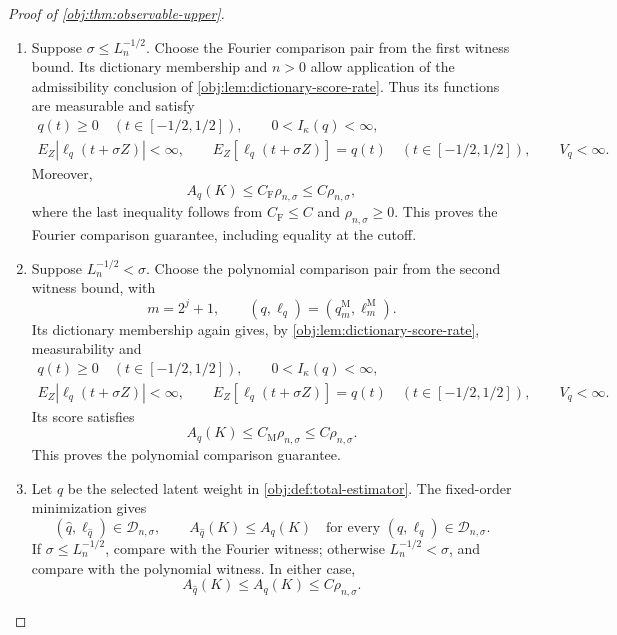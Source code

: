 \documentclass[11pt]{article}
\begin{document}
\begin{proof}[Proof of \cref{obj:thm:observable-upper}]
\begin{enumerate}
\item Suppose \(\sigma\le L_n^{-1/2}\). Choose the Fourier comparison pair from the first witness bound. Its dictionary membership and \(n>0\) allow application of the admissibility conclusion of \cref{obj:lem:dictionary-score-rate}. Thus its functions are measurable and satisfy
\[
\begin{gathered}
q(t)\ge0\quad(t\in[-1/2,1/2]),
\qquad 0<I_\kappa(q)<\infty,\\
E_Z|\ell_q(t+\sigma Z)|<\infty,
\qquad E_Z[\ell_q(t+\sigma Z)]=q(t)
\quad(t\in[-1/2,1/2]),
\qquad V_q<\infty.
\end{gathered}
\]
Moreover,
\[
A_q(K)\le C_{\mathrm F}\rho_{n,\sigma}
\le C\rho_{n,\sigma},
\]
where the last inequality follows from \(C_{\mathrm F}\le C\) and \(\rho_{n,\sigma}\ge0\). This proves the Fourier comparison guarantee, including equality at the cutoff. %

\item Suppose \(L_n^{-1/2}<\sigma\). Choose the polynomial comparison pair from the second witness bound, with
\[
m=2^j+1,
\qquad
(q,\ell_q)=(q_m^{\mathrm M},\ell_m^{\mathrm M}).
\]
Its dictionary membership again gives, by \cref{obj:lem:dictionary-score-rate}, measurability and
\[
\begin{gathered}
q(t)\ge0\quad(t\in[-1/2,1/2]),
\qquad 0<I_\kappa(q)<\infty,\\
E_Z|\ell_q(t+\sigma Z)|<\infty,
\qquad E_Z[\ell_q(t+\sigma Z)]=q(t)
\quad(t\in[-1/2,1/2]),
\qquad V_q<\infty.
\end{gathered}
\]
Its score satisfies
\[
A_q(K)\le C_{\mathrm M}\rho_{n,\sigma}
\le C\rho_{n,\sigma}.
\]
This proves the polynomial comparison guarantee. %

\item Let \(\widehat q\) be the selected latent weight in \cref{obj:def:total-estimator}. The fixed-order minimization gives
\[
(\widehat q,\ell_{\widehat q})\in\mathcal D_{n,\sigma},
\qquad
A_{\widehat q}(K)\le A_q(K)
\quad\text{for every }(q,\ell_q)\in\mathcal D_{n,\sigma}.
\]
If \(\sigma\le L_n^{-1/2}\), compare with the Fourier witness; otherwise \(L_n^{-1/2}<\sigma\), and compare with the polynomial witness. In either case,
\[
A_{\widehat q}(K)\le A_q(K)\le C\rho_{n,\sigma}.
\]


\end{enumerate}
\end{proof}
\end{document}
